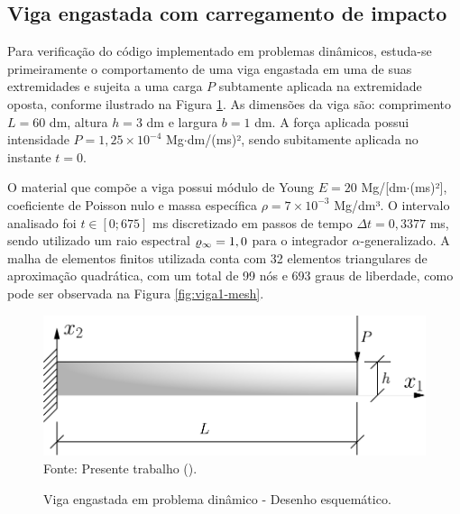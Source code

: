 \subsection{Viga engastada com carregamento de impacto} \label{Ap:DinBeam}

Para verificação do código implementado em problemas dinâmicos, estuda-se  primeiramente o comportamento de uma viga engastada em uma de suas extremidades e sujeita a uma carga $P$ subtamente aplicada na extremidade oposta, conforme ilustrado na Figura \ref{fig:viga1}. As dimensões da viga são: comprimento $L=60$ dm, altura $h=3$ dm e largura $b=1$ dm. A força aplicada possui intensidade $P=1,25\times10^{-4}$ Mg$\cdot$dm/(ms)², sendo subitamente aplicada no instante $t=0$.

O material que compõe a viga possui módulo de Young $E=20$ Mg/[dm$\cdot$(ms)²], coeficiente de Poisson nulo e massa específica $\rho=7\times10^{-3}$ Mg/dm³. O intervalo analisado foi $t\in[0;675]$ ms discretizado em passos de tempo $\Delta t=0,3377$ ms, sendo utilizado um raio espectral $\varrho_\infty=1,0$ para o integrador $\alpha$-generalizado. A malha de elementos finitos utilizada conta com 32 elementos triangulares de aproximação quadrática, com um total de 99 nós e 693 graus de liberdade, como pode ser observada na Figura \ref{fig:viga1-mesh}.

\begin{figure}[h!]
    \centering
    \caption{Viga engastada em problema dinâmico - Desenho esquemático.}
    \includegraphics[width=0.5\linewidth]{Figuras/vigas/viga1.pdf}
    \\Fonte: Presente trabalho (\the\year).
    \label{fig:viga1}
\end{figure}

